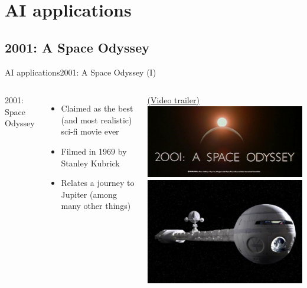 \documentclass[10pt,compress]{beamer} %
\begin{document}
\section{AI applications}
\subsection{2001: A Space Odyssey}

\begin{frame}{AI applications}{2001: A Space Odyssey (I)}
	\begin{columns}
			2001: Space Odyssey
			\begin{itemize}
			\item Claimed as the best (and most realistic) sci-fi movie ever
			\item Filmed in 1969 by Stanley Kubrick
			\item Relates a journey to Jupiter (among many other things)
			\end{itemize}
			\href{https://www.youtube.com/watch?v=XHjIqQBsPjk}{(Video trailer)}
		\includegraphics[width=\linewidth]{figs/kubrick1.jpg}\\
		\includegraphics[width=\linewidth]{figs/2001-nave.jpg}
	\end{columns}
\end{frame}
\end{document}
